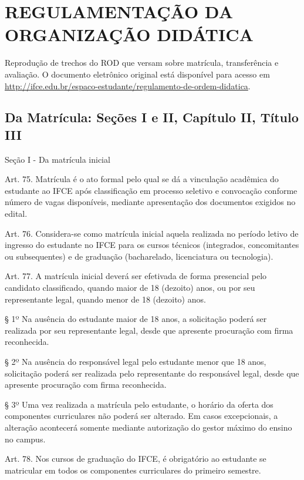 \documentclass{paper}
\def\web#1{\href{#1}{#1}}
\begin{document}
\clearpage\section{REGULAMENTAÇÃO DA ORGANIZAÇÃO DIDÁTICA}
\label{anexoROD}

Reprodução de trechos do ROD que versam sobre matrícula, transferência e avaliação. O documento eletrônico original está disponível para acesso em \web{http://ifce.edu.br/espaco-estudante/regulamento-de-ordem-didatica}.

\subsection{Da Matrícula: Seções I e II, Capítulo II, Título III}
\label{anexoRODmatricula}

\begin{center}
Seção I - Da matrícula inicial
\end{center}

Art. 75. Matrícula é o ato formal pelo qual se dá a vinculação acadêmica do estudante ao IFCE após classificação em processo seletivo e convocação conforme número de vagas disponíveis, mediante apresentação dos documentos exigidos no edital.

Art. 76. Considera-se como matrícula inicial aquela realizada no período letivo de ingresso do estudante no IFCE para os cursos técnicos (integrados, concomitantes ou subsequentes) e de graduação (bacharelado, licenciatura ou tecnologia).

Art. 77. A matrícula inicial deverá ser efetivada de forma presencial pelo candidato classificado, quando maior de 18 (dezoito) anos, ou por seu representante legal, quando menor de 18 (dezoito) anos.

§ 1º Na ausência do estudante maior de 18 anos, a solicitação poderá ser realizada por seu representante legal, desde que apresente procuração com firma reconhecida.

§ 2º Na ausência do responsável legal pelo estudante menor que 18 anos, solicitação poderá ser realizada pelo representante do responsável legal, desde que apresente procuração com firma reconhecida.

§ 3º Uma vez realizada a matrícula pelo estudante, o horário da oferta dos componentes curriculares não poderá ser alterado. Em casos excepcionais, a alteração acontecerá somente mediante autorização do gestor máximo do ensino no campus.

Art. 78. Nos cursos de graduação do IFCE, é obrigatório ao estudante se matricular em todos os componentes curriculares do primeiro semestre.
\end{document}
